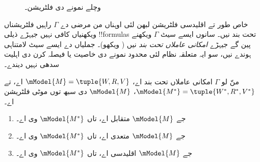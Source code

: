 \documentclass[../../../include/open-logic-section]{subfiles}
\begin{document}
\begin{figure}[ht]
  \centering
  \caption{ وچلے نمونے دی فلٹریشن۔}
\end{figure}

خاص طور تے اقلیدسی فلٹریشن لبھن لئی اوہناں من مرضی دے $\Gamma$ راہیں فلٹریشناں ویکھنیاں کافی نہیں جیہڑے ذیلی !!{formula}s تحت بند نیں۔ سانوں ایسے سیٹ $\Gamma$ ویکھنے پین گے جیہڑے \emph{امکانی عاملاں تحت بند} نیں ( ویکھو)۔ جملیاں دے ایسے سیٹ لامتناہی ہوندے نیں، سو ایہ متعلقہ نظام لئی محدود نمونے دی خاصیت یا فیصلہ کرن دی اہلیت سدھی نہیں دیندے۔

\begin{thm}
  منّ لو $\Gamma$ امکانی عاملاں تحت بند اے، $\mModel{M}=\tuple{W,R,V}$ اے، تے
  $\mModel{M^*} = \tuple{W^*,R^*,V^*}$، $\mModel{M}$ دی سبھ توں موٹی فلٹریشن اے۔
  \begin{enumerate}
  \item جے $\mModel{M}$ متقابل اے، تاں $\mModel{M^*}$ وی اے۔
  \item جے $\mModel{M}$ متعدی اے، تاں $\mModel{M^*}$ وی اے۔
  \item جے $\mModel{M}$ اقلیدسی اے، تاں $\mModel{M^*}$ وی اے۔
  \end{enumerate}
\end{thm}
\end{document}
